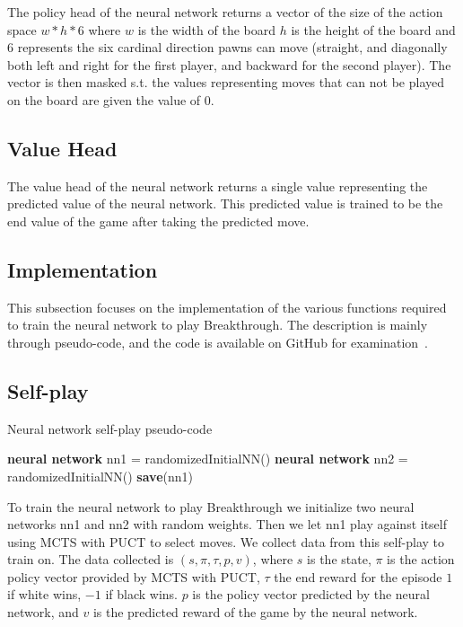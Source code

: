 The policy head of the neural network returns a vector of the size of the action space $w * h * 6$ where $w$ is the width of the board $h$ is the height of the board and $6$ represents the six cardinal direction pawns can move (straight, and diagonally both left and right for the first player, and backward for the second player). The vector is then masked s.t. the values representing moves that can not be played on the board are given the value of $0$.

\subsection{Value Head}

The value head of the neural network returns a single value representing the predicted value of the neural network. This predicted value is trained to be the end value of the game after taking the predicted move.

\subsection{Implementation}

This subsection focuses on the implementation of the various functions required to train the neural network to play Breakthrough. The description is mainly through pseudo-code, and the code is available on GitHub for examination~\cite{siggi:github}.

\subsection{Self-play}

\begin{algorithm}[t]
    \caption{Neural network self-play pseudo-code}
    \label{alg:selfplay}
    \begin{algorithmic}[1]
        \STATE \textbf{neural network} nn1 = randomizedInitialNN()
        \STATE \textbf{neural network} nn2 = randomizedInitialNN()
        \WHILE{\TRUE}
        \ELSE
        \ENDIF
        \STATE \textbf{save}(nn1)
        \ENDWHILE
    \end{algorithmic}
\end{algorithm}

To train the neural network to play Breakthrough we initialize two neural networks nn1 and nn2 with random weights. Then we let nn1 play against itself using MCTS with PUCT to select moves. We collect data from this self-play to train on. The data collected is $(s, \pi, \tau, p, v)$, where $s$ is the state, $\pi$ is the action policy vector provided by MCTS with PUCT, $\tau$ the end reward for the episode $1$ if white wins, $-1$ if black wins. $p$ is the policy vector predicted by the neural network, and $v$ is the predicted reward of the game by the neural network.

